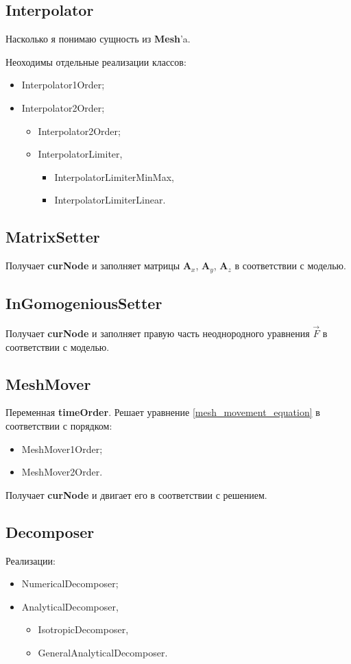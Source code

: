 \documentclass[a4paper,12pt]{article}
\numberwithin{equation}{section}
\begin{document}
\subsection{Interpolator}
	Насколько я понимаю сущность из \textbf{Mesh}'a.
	
	Неоходимы отдельные реализации классов:
	\begin{itemize}
		\item{Interpolator1Order;}
		\item{Interpolator2Order;}
		\begin{itemize}
				\item{Interpolator2Order;}
				\item{InterpolatorLimiter,}
				\begin{itemize}
					\item{InterpolatorLimiterMinMax,}
					\item{InterpolatorLimiterLinear.}
				\end{itemize}
		\end{itemize}
	\end{itemize}
	
\subsection{MatrixSetter}
	Получает \textbf{curNode} и заполняет матрицы $\mathbf{A}_x$, $\mathbf{A}_y$, $\mathbf{A}_z$ в соответствии с моделью.
	
\subsection{InGomogeniousSetter}
	Получает \textbf{curNode} и заполняет правую часть неоднородного уравнения $\vec{F}$ в соответствии с моделью.
	
\subsection{MeshMover}
	Переменная \textbf{timeOrder}.
	Решает уравнение \eqref{mesh_movement_equation} в соответствии с порядком:
	\begin{itemize}
		\item{MeshMover1Order;}
		\item{MeshMover2Order.}
	\end{itemize}	
	
	Получает \textbf{curNode} и двигает его в соответствии с решением.

\subsection{Decomposer}
	Реализации:
	\begin{itemize}
			\item{NumericalDecomposer;}
			\item{AnalyticalDecomposer,}
			\begin{itemize}
					\item{IsotropicDecomposer,}
					\item{GeneralAnalyticalDecomposer.}
			\end{itemize}
	\end{itemize}
\end{document}
